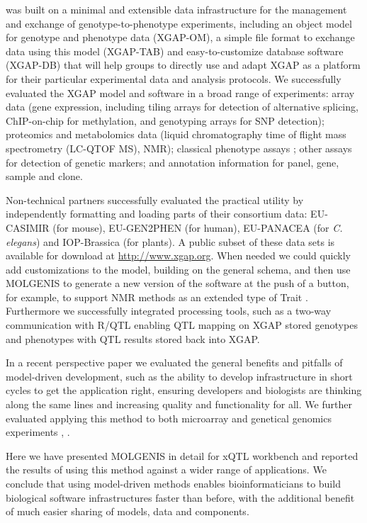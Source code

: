 \xqtlwb was built on a minimal and extensible data infrastructure for the management and 
exchange of genotype-to-phenotype experiments, including an object model for genotype and 
phenotype data (XGAP-OM), a simple file format to exchange data using this model (XGAP-TAB) 
and easy-to-customize database software (XGAP-DB) that will help groups to directly use and 
adapt XGAP as a platform for their particular experimental data and analysis protocols. We 
successfully evaluated the XGAP model and software in a broad range of experiments: array 
data (gene expression, including tiling arrays for detection of alternative splicing, 
ChIP-on-chip for methylation, and genotyping arrays for SNP detection); proteomics and 
metabolomics data (liquid chromatography time of flight mass spectrometry (LC-QTOF MS), NMR); 
classical phenotype assays \cite{Heap:2009, Bystrykh:2005, Li:2006, Keurentjes:2006, Stranger:2007, Bailey:2008, Beamer:1999}; 
other assays for detection of genetic markers; and annotation information for panel, gene, 
sample and clone. 

Non-technical partners successfully evaluated the practical utility by independently 
formatting and loading parts of their consortium data: EU-CASIMIR (for mouse), EU-GEN2PHEN (for human), 
EU-PANACEA (for \emph{C. elegans}) and IOP-Brassica (for plants). A public subset of these data sets 
is available for download at \url{http://www.xgap.org}. When needed we could quickly add customizations to the 
model, building on the general schema, and then use MOLGENIS to generate a new version of the 
software at the push of a button, for example, to support NMR methods as an extended type of 
Trait \cite{Fu:2009}. Furthermore we successfully integrated processing tools, such as a two-way 
communication with R/QTL \cite{Broman:2003, Arends:2010} enabling QTL mapping on XGAP 
stored genotypes and phenotypes with QTL results stored back into XGAP.

In a recent perspective paper \cite{Swertz:2007} we evaluated the general benefits and pitfalls of model-driven 
development, such as the ability to develop infrastructure in short cycles to get the application 
right, ensuring developers and biologists are thinking along the same lines and increasing quality 
and functionality for all. We further evaluated applying this method to both microarray and genetical 
genomics experiments \cite{Swertz:2004}, \cite{Swertz:2010a}.

Here we have presented MOLGENIS in detail for xQTL workbench and reported the results of using this 
method against a wider range of applications. We conclude that using model-driven methods enables 
bioinformaticians to build biological software infrastructures faster than before, with the additional 
benefit of much easier sharing of models, data and components.


